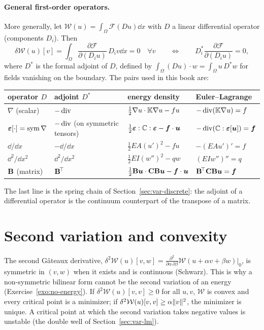 \paragraph{General first-order operators.} More generally, let
%
$\displaystyle \mathcal W(u)=\int_\Omega\mathcal F(Du)\dd x$ with $D$ a linear differential
operator (components $D_i$). Then
\[
  \delta\mathcal W(u)[v]=\int_\Omega\frac{\partial\mathcal F}{\partial(D_iu)}\,D_iv\dd x=0
  \quad\forall v
  \qquad\Longleftrightarrow\qquad
  D_i^\ast\frac{\partial\mathcal F}{\partial(D_iu)}=0,
\]
where $D^\ast$ is the formal adjoint of $D$, defined by
$\displaystyle \int_\Omega(Du)\cdot w=\int_\Omega u\,D^\ast w$ for fields vanishing on the
boundary. The pairs used in this book are:
\begin{center}
\renewcommand{\arraystretch}{1.25}
\begin{tabular}{llll}
\toprule
\sffamily operator $D$ & \sffamily adjoint $D^\ast$ & \sffamily energy density & \sffamily Euler--Lagrange\\
\midrule
$\nabla$ (scalar) & $-\operatorname{div}$ & $\tfrac12\nabla u\cdot\mathbb{K}\nabla u-fu$ & $-\operatorname{div}(\mathbb{K}\nabla u)=f$\\
$\bm{\varepsilon}[\cdot]=\operatorname{sym}\nabla$ & $-\operatorname{div}$ (on symmetric tensors) & $\tfrac12\bm{\varepsilon}:\mathbb{C}:\bm{\varepsilon}-\bm{f}\cdot\bm{u}$ & $-\operatorname{div}(\mathbb{C}:\bm{\varepsilon}[\bm{u}])=\bm{f}$\\
$\dd/\dd x$ & $-\dd/\dd x$ & $\tfrac12EA(u')^2-fu$ & $-(EAu')'=f$\\
$\dd^2/\dd x^2$ & $\dd^2/\dd x^2$ & $\tfrac12EI(w'')^2-qw$ & $(EIw'')''=q$\\
$\mathbf{B}$ (matrix) & $\mathbf{B}^{\!\top}$ & $\tfrac12\mathbf{B}\bm{u}\cdot\mathbf{C}\mathbf{B}\bm{u}-\bm{f}\cdot\bm{u}$ & $\mathbf{B}^{\!\top}\mathbf{C}\mathbf{B}\bm{u}=\bm{f}$\\
\bottomrule
\end{tabular}
\end{center}
The last line is the spring chain of Section~\ref{sec:var-discrete}: the
adjoint of a differential operator is the continuum counterpart of the
transpose of a matrix.

\section{Second variation and convexity}
%
The second G\^ateaux derivative,
$\displaystyle \delta^2\mathcal W(u)[v,w]=\frac{\partial^2}{\partial\alpha\,\partial\beta}\mathcal W(u+\alpha v+\beta w)\big|_{0}$,
is symmetric in $(v,w)$ when it exists and is continuous (Schwarz). This is
why a non-symmetric bilinear form cannot be the second variation of an energy
(Exercise~\ref{exo:no-energy}). If $\delta^2\mathcal W(u)[v,v]\ge0$ for all
$u,v$, $\mathcal W$ is convex and every critical point is a minimizer; if
$\delta^2\mathcal W(u)[v,v]\ge\alpha\lVert v\rVert^2$, the minimizer is unique. A
critical point at which the second variation takes negative values is
unstable (the double well of Section~\ref{sec:var-lm}).

